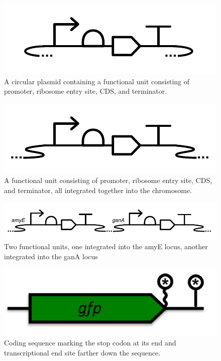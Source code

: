{\begin{figure}[h!]
\includegraphics[scale=1.0]{figures/apdx-examples/apdx-exa16-circular-plasmid-example.pdf}
\caption{A circular plasmid containing a functional unit consisting of promoter, ribosome entry site, CDS, and terminator.}\label{f:apdx:exa16}
\end{figure}

\begin{figure}[h!]
\includegraphics[scale=1.0]{figures/apdx-examples/apdx-exa17-chromosomal-locus-example.pdf}
\caption{A functional unit consisting of promoter, ribosome entry site, CDS, and terminator, all integrated together into the chromosome.}
\label{f:apdx:exa17}
\end{figure}

\begin{figure}[h!]
\includegraphics[scale=1.0]{figures/apdx-examples/apdx-exa18-chromosomal-locus-example2.pdf}
\caption{Two functional units, one integrated into the amyE locus, another integrated into the ganA locus}\label{f:apdx:exa18}
\end{figure}

\begin{figure}[h!]
\includegraphics[scale=0.5]{figures/apdx-examples/apdx-exa19-stop-sites.pdf}
\caption{Coding sequence marking the stop codon  at its end and transcriptional end site farther down the sequence.}
\label{f:apdx:exa19}
\end{figure}

}
